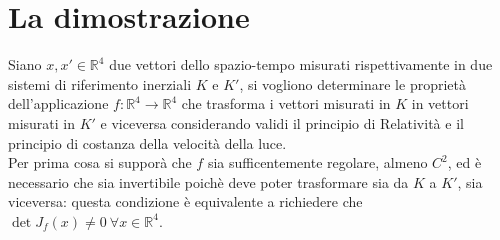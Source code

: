 \section{La dimostrazione}
Siano $x,x'\in\mathbb{R}^4$ due vettori dello spazio-tempo misurati rispettivamente in due sistemi di riferimento inerziali $K$ e $K'$, 
si vogliono determinare le proprietà dell'applicazione $f:\mathbb{R}^4\rightarrow\mathbb{R}^4$ che trasforma i vettori misurati in $K$ 
in vettori misurati in $K'$ e viceversa considerando validi il principio di Relatività e il principio di costanza della velocità della luce.\\

Per prima cosa si supporà che $f$ sia sufficentemente regolare, almeno $C^2$, ed è necessario che sia invertibile poichè deve poter 
trasformare sia da $K$ a $K'$, sia viceversa: questa condizione è equivalente a richiedere che $\det J_f(x)\neq 0\ \forall x\in\mathbb{R}^4$.\\

